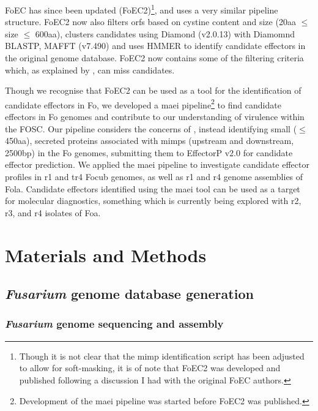 FoEC has since been updated \parencite{FoEC2} (FoEC2)\footnote{Though it is not clear that the \ac{mimp} identification script has been adjusted to allow for soft-masking, it is of note that FoEC2 was developed and published following a discussion I had with the original FoEC authors.}, and uses a very similar pipeline structure. FoEC2 now also filters \acp{orf} based on cystine content and size (20aa $\leq$ size $\leq$ 600aa), clusters candidates using Diamond (v2.0.13) with Diamomnd BLASTP, MAFFT (v7.490) \parencite{Katoh2019} and uses HMMER \parencite{Eddy2011} to identify candidate effectors in the original genome database. FoEC2 now contains some of the filtering criteria which, as explained by \textcite{Sperschneider2015, LoPresti2015, Todd2022}, can miss candidates. 

Though we recognise that FoEC2 can be used as a tool for the identification of candidate effectors in \ac{Fo}, we developed a \ac{maei} pipeline\footnote{Development of the \ac{maei} pipeline was started before FoEC2 was published.} to find candidate effectors in \ac{Fo} genomes and contribute to our understanding of virulence within the \ac{FOSC}. Our pipeline considers the concerns of \textcite{LoPresti2015, Sperschneider2015, Todd2022}, instead identifying small ($\leq$450aa), secreted proteins associated with \acp{mimp} (upstream and downstream, 2500bp) in the \ac{Fo} genomes, submitting them to EffectorP v2.0 for candidate effector prediction. We applied the \ac{maei} pipeline to investigate candidate effector profiles in \ac{r1} and \ac{tr4} \ac{Focub} genomes, as well as \ac{r1} and \ac{r4} genome assemblies of \ac{Fola}. Candidate effectors identified using the \ac{maei} tool can be used as a target for molecular diagnostics, something which is currently being explored with \ac{r2}, \ac{r3}, and \ac{r4} isolates of \ac{Foa}. 

\newpage
\section{Materials and Methods}

\subsection{\textit{Fusarium} genome database generation}\label{chap3:fusariumdb}

\subsubsection{\textit{Fusarium} genome sequencing and assembly}

